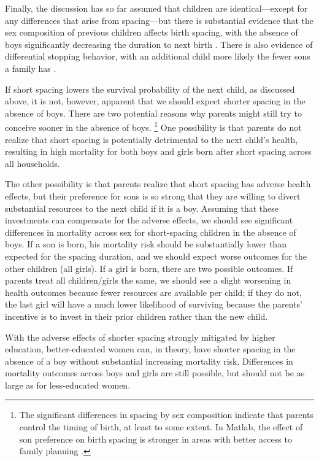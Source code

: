 Finally, the discussion has so far assumed that children are identical---except 
for any differences that arise from spacing---but there is substantial evidence 
that the sex composition of previous children affects birth spacing, with the
absence of boys significantly decreasing the duration to next birth
\citep{Haughton1995,Haughton1996,Rahman1993,Bhalotra2008,Kumar2016,Soest2018}.
There is also evidence of differential stopping behavior, with an additional child 
more likely the fewer sons a family has 
\citep{repetto72,Das1987,Arnold1997,arnold98,clark00,Basu2010,Barcellos2014}.

If short spacing lowers the survival probability of the next child, as discussed above,
it is not, however, apparent that we should expect shorter spacing in the absence of boys.
There are two potential reasons why parents might still try to conceive sooner 
in the absence of boys.%
\footnote{
The significant differences in spacing by sex composition indicate that
parents control the timing of birth, at least to some extent.
In Matlab, the effect of son preference on birth spacing is stronger in 
areas with better access to family planning \citep{Rahman1993}.
}
One possibility is that parents do not realize that short spacing is potentially
detrimental to the next child's health, resulting in high mortality for both boys 
and girls born after short spacing across all households.

The other possibility is that parents realize that short spacing has adverse 
health effects, but their preference for sons is so strong that they are willing to 
divert substantial resources to the next child if it is a boy.
Assuming that these investments can compensate for the adverse effects,
we should see significant differences in mortality across sex for short-spacing 
children in the absence of boys.
If a son is born, his mortality risk should be substantially lower than expected 
for the spacing duration, and we should expect worse outcomes for the other 
children (all girls).
If a girl is born, there are two possible outcomes.
If parents treat all children/girls the same, we should see a slight worsening in 
health outcomes because fewer resources are available per child; 
if they do not, the last girl will have a much lower likelihood of surviving 
because the parents' incentive is to invest in their prior children rather than 
the new child.

With the adverse effects of shorter spacing strongly mitigated by higher education,
better-educated women can, in theory, have shorter spacing in the absence of a boy 
without substantial increasing mortality risk.
Differences in mortality outcomes across boys and girls are still possible,
but should not be as large as for less-educated women.

